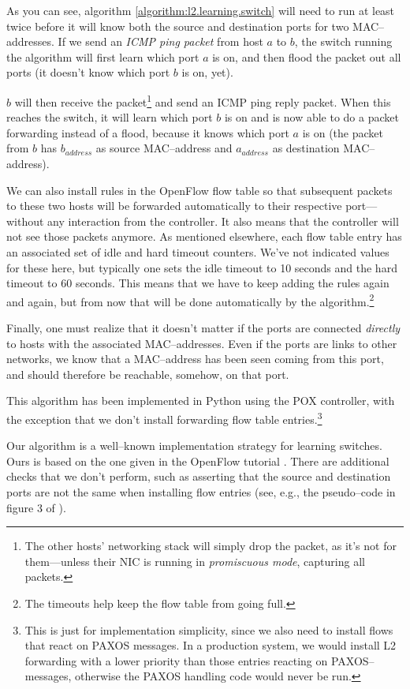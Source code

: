 As you can see, algorithm \ref{algorithm:l2.learning.switch} will need to
run at least twice before it will know both the source and destination ports
for two MAC--addresses.  If we send an \textit{\acs{ICMP} ping packet} from
host $a$ to $b$, the switch running the algorithm will first learn which port
$a$ is on, and then flood the packet out all ports (it doesn't know which
port $b$ is on, yet).

$b$ will then receive the packet\footnote{The other hosts' networking stack
will simply drop the packet, as it's not for them---unless their \acs{NIC} is
running in \textit{promiscuous mode}, capturing all packets.} and send an \acs{ICMP}
ping reply packet.  When this reaches the switch, it will learn which port
$b$ is on and is now able to do a packet forwarding instead of a flood,
because it knows which port $a$ is on (the packet from $b$ has $b_{address}$ as
source MAC--address and $a_{address}$ as destination MAC--address).

We can also install rules in the OpenFlow flow table so that
subsequent packets to these two hosts will be forwarded automatically to
their respective port---without any interaction from the controller.  It
also means that the controller will not see those packets anymore.  As
mentioned elsewhere, each flow table entry has an associated set of idle and
hard timeout counters.  We've not indicated values for these here, but
typically one sets the idle timeout to 10 seconds and the hard timeout to 60
seconds.  This means that we have to keep adding the rules again and again,
but from now that will be done automatically by the algorithm.\footnote{The
timeouts help keep the flow table from going full.}

Finally, one must realize that it doesn't matter if the ports are connected
\textit{directly} to hosts with the associated MAC--addresses.  Even if the
ports are links to other networks, we know that a MAC--address has been seen
coming from this port, and should therefore be reachable, somehow, on that
port.

This algorithm has been implemented in Python using the POX controller, with
the exception that we don't install forwarding flow table
entries.\footnote{This is just for implementation simplicity, since we also
need to install flows that react on PAXOS messages.  In a production
system, we would install L2 forwarding with a lower priority than those
entries reacting on PAXOS--messages, otherwise the PAXOS handling code would
never be run.}

Our algorithm is a well--known implementation strategy for learning
switches.  Ours is based on the one given in the OpenFlow tutorial .
There are additional checks that we don't perform, such as
asserting that the source and destination ports are not the same when
installing flow entries (see, e.g., the pseudo--code in figure 3 of
\cite{Canini:2012:NWT:2228298.2228312}).
